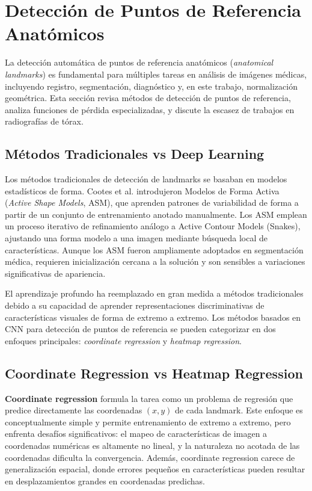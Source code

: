 \section{Detección de Puntos de Referencia Anatómicos}
\label{sec:landmark_detection}

La detección automática de puntos de referencia anatómicos (\textit{anatomical landmarks}) es fundamental para múltiples tareas en análisis de imágenes médicas, incluyendo registro, segmentación, diagnóstico y, en este trabajo, normalización geométrica. Esta sección revisa métodos de detección de puntos de referencia, analiza funciones de pérdida especializadas, y discute la escasez de trabajos en radiografías de tórax.

\subsection{Métodos Tradicionales vs Deep Learning}

Los métodos tradicionales de detección de landmarks se basaban en modelos estadísticos de forma. Cootes et al. \cite{cootes1995active} introdujeron Modelos de Forma Activa (\textit{Active Shape Models}, ASM), que aprenden patrones de variabilidad de forma a partir de un conjunto de entrenamiento anotado manualmente. Los ASM emplean un proceso iterativo de refinamiento análogo a Active Contour Models (Snakes), ajustando una forma modelo a una imagen mediante búsqueda local de características. Aunque los ASM fueron ampliamente adoptados en segmentación médica, requieren inicialización cercana a la solución y son sensibles a variaciones significativas de apariencia.

El aprendizaje profundo ha reemplazado en gran medida a métodos tradicionales debido a su capacidad de aprender representaciones discriminativas de características visuales de forma de extremo a extremo. Los métodos basados en CNN para detección de puntos de referencia se pueden categorizar en dos enfoques principales: \textit{coordinate regression} y \textit{heatmap regression}.

\subsection{Coordinate Regression vs Heatmap Regression}

\textbf{Coordinate regression} formula la tarea como un problema de regresión que predice directamente las coordenadas $(x, y)$ de cada landmark. Este enfoque es conceptualmente simple y permite entrenamiento de extremo a extremo, pero enfrenta desafíos significativos: el mapeo de características de imagen a coordenadas numéricas es altamente no lineal, y la naturaleza no acotada de las coordenadas dificulta la convergencia. Además, coordinate regression carece de generalización espacial, donde errores pequeños en características pueden resultar en desplazamientos grandes en coordenadas predichas.

